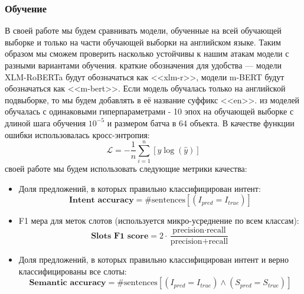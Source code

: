 \subsubsection{Обучение}\label{subsubsec:model_name}
В своей работе мы будем сравнивать модели, обученные на всей обучающей выборке и только на части обучающей выборки на английском языке.
Таким образом мы сможем проверить насколько устойчивы к нашим атакам модели с разными вариантами обучения.
 краткие обозначения для удобства — модели XLM-RoBERTa будут обозначаться как <<xlm-r>>, модели m-BERT будут обозначаться как <<m-bert>>.
Если модель обучалась только на английской подвыборке, то мы будем добавлять в её название суффикс <<en>>.
 из моделей обучалась с одинаковыми гиперпараметрами - 10 эпох на обучающей выборке с длиной шага обучения $10^{-5}$ и размером батча в 64 объекта.
В качестве функции ошибки использовалась кросс-энтропия:
\begin{equation}
    \mathcal{L} = -\dfrac{1}{n}\sum\limits_{i = 1}^{n}\left[ y\log\left(\hat{y}\right) \right]\label{eq:equation4}
\end{equation}
 своей работе мы будем использовать следующие метрики качества:
\begin{itemize}
    \item Доля предложений, в которых правильно классифицирован интент:
    \begin{equation}
        \textbf{Intent accuracy} = \# \text{sentences} \left[ \left(I_{pred} = I_{true} \right) \right]\label{eq:equation}
    \end{equation}
    \item F1 мера для меток слотов (используется микро-усреднение по всем классам):
    \begin{equation}
        \textbf{Slots F1 score} = 2 \cdot \dfrac{\text{precision} \cdot \text{recall}}{\text{precision} + \text{recall}}\label{eq:equation2}
    \end{equation}
    \item Доля предложений, в которых правильно классифицирован интент и верно классифицированы все слоты:
    \begin{equation}
        \textbf{Semantic accuracy} = \# \text{sentences} \left[ \left(I_{pred} = I_{true} \right) \land \left(S_{pred} = S_{true} \right)\right]\label{eq:equation3}
    \end{equation}
\end{itemize}

\newpage

